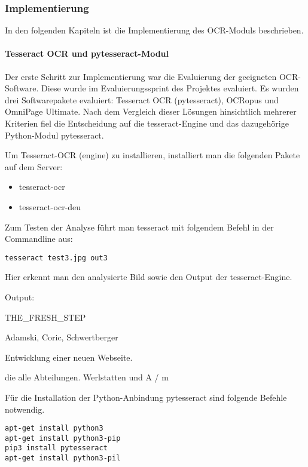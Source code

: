 \subsubsection{Implementierung}
In den folgenden Kapiteln ist die Implementierung des OCR-Moduls beschrieben.
\paragraph{Tesseract OCR und pytesseract-Modul}
Der erste Schritt zur Implementierung war die Evaluierung der geeigneten OCR-Software. Diese wurde im Evaluierungssprint des Projektes evaluiert. Es wurden drei Softwarepakete evaluiert: Tesseract OCR (pytesseract), OCRopus und OmniPage Ultimate. Nach dem Vergleich dieser Lösungen hinsichtlich mehrerer Kriterien fiel die Entscheidung auf die tesseract-Engine und das dazugehörige Python-Modul pytesseract.

Um Tesseract-OCR (engine) zu installieren, installiert man die folgenden Pakete auf dem Server:
\begin{itemize}
\item tesseract-ocr
\item tesseract-ocr-deu
\end{itemize}
Zum Testen der Analyse führt man tesseract mit folgendem Befehl in der Commandline aus:
\begin{lstlisting}[caption={tesseract-Ausführung}]
tesseract test3.jpg out3
\end{lstlisting}
\cite{TESS1} \cite{TESS2}

Hier erkennt man den analysierte Bild sowie den Output der tesseract-Engine.


Output:

THE\_FRESH\_STEP

Adamski, Coric, Schwertberger

Entwicklung einer neuen Webseite.

die alle Abteilungen. Werlstatten und A / m

Für die Installation der Python-Anbindung pytesseract sind folgende Befehle notwendig.

\begin{lstlisting}[caption={pytesseract-Installation}]
apt-get install python3
apt-get install python3-pip
pip3 install pytesseract
apt-get install python3-pil
\end{lstlisting}
\cite{PYTES} \cite{PYTES2} \cite{PYTES3}

